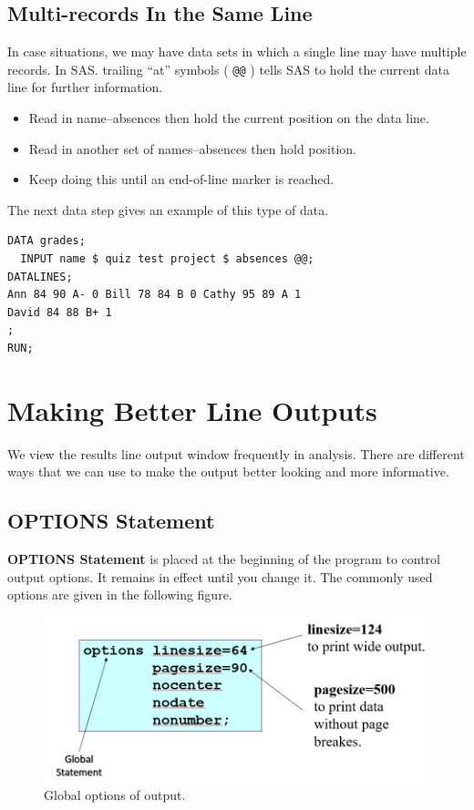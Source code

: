 \documentclass[
]{book}
\providecommand{\tightlist}{%
  \setlength{\itemsep}{0pt}\setlength{\parskip}{0pt}}
\begin{document}
\hypertarget{multi-records-in-the-same-line}{%
\subsection{Multi-records In the Same Line}\label{multi-records-in-the-same-line}}

In case situations, we may have data sets in which a single line may have multiple records. In SAS. trailing ``at'' symbols ( \texttt{@@} ) tells SAS to hold the current data line for further information.

\begin{itemize}
\tightlist
\item
  Read in name--absences then hold the current position on the data line.
\item
  Read in another set of names--absences then hold position.
\item
  Keep doing this until an end-of-line marker is reached.
\end{itemize}

The next data step gives an example of this type of data.

\begin{verbatim}
DATA grades;
  INPUT name $ quiz test project $ absences @@;
DATALINES;
Ann 84 90 A- 0 Bill 78 84 B 0 Cathy 95 89 A 1 
David 84 88 B+ 1
;
RUN;
\end{verbatim}

\hypertarget{making-better-line-outputs}{%
\section{Making Better Line Outputs}\label{making-better-line-outputs}}

We view the results line output window frequently in analysis. There are different ways that we can use to make the output better looking and more informative.

\hypertarget{options-statement}{%
\subsection{OPTIONS Statement}\label{options-statement}}

\textbf{OPTIONS Statement} is placed at the beginning of the program to control output options. It remains in effect until you change it. The commonly used options are given in the following figure.

\begin{figure}

{\centering \includegraphics[width=0.6\linewidth]{img03/w03-GlobalOptions} 

}

\caption{Global options of output.}\label{fig:unnamed-chunk-22}
\end{figure}
\end{document}
